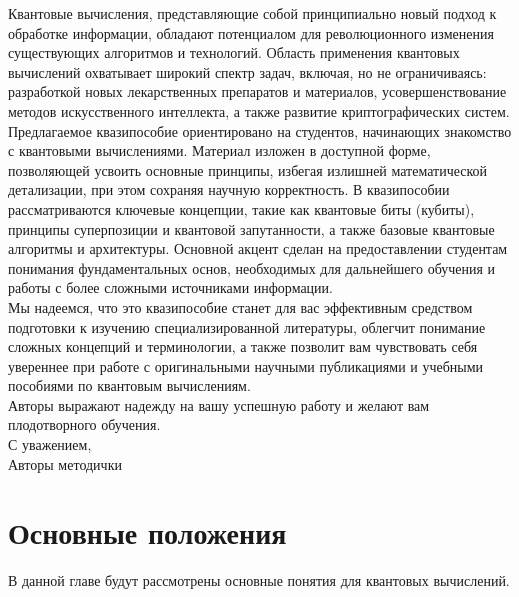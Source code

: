\documentclass[12pt,a4paper]{article}
\begin{document}
	Квантовые вычисления, представляющие собой принципиально новый подход к обработке информации, обладают потенциалом для революционного изменения существующих алгоритмов и технологий. Область применения квантовых вычислений охватывает широкий спектр задач, включая, но не ограничиваясь: разработкой новых лекарственных препаратов и материалов, усовершенствование методов искусственного интеллекта, а также развитие криптографических систем.\\
	
	Предлагаемое квазипособие ориентировано на студентов, начинающих знакомство с квантовыми вычислениями. Материал изложен в доступной форме, позволяющей усвоить основные принципы, избегая излишней математической детализации, при этом сохраняя научную корректность. В квазипособии рассматриваются ключевые концепции, такие как квантовые биты (кубиты), принципы суперпозиции и квантовой запутанности, а также базовые квантовые алгоритмы и архитектуры. Основной акцент сделан на предоставлении студентам понимания фундаментальных основ, необходимых для дальнейшего обучения и работы с более сложными источниками информации.\\
	
	Мы надеемся, что это квазипособие станет для вас эффективным средством подготовки к изучению специализированной литературы, облегчит понимание сложных концепций и терминологии, а также позволит вам чувствовать себя увереннее при работе с оригинальными научными публикациями и учебными пособиями по квантовым вычислениям.\\
	
	
	Авторы выражают надежду на вашу успешную работу и желают вам плодотворного обучения.\\
	
	С уважением,\\ Авторы методички\\
	
	\newpage
	\section{Основные положения}
	В данной главе будут рассмотрены основные понятия для квантовых вычислений.
\end{document}
